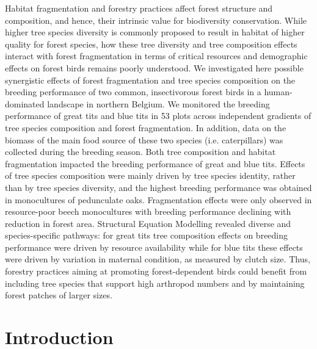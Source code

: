 \documentclass[10pt, twoside]{book} %
\begin{document}
Habitat fragmentation and forestry practices affect forest structure and composition, and hence, their intrinsic value for biodiversity conservation. While higher tree species diversity is commonly proposed to result in habitat of higher quality for forest species, how these tree diversity and tree composition effects interact with forest fragmentation in terms of critical resources and demographic effects on forest birds remains poorly understood. We investigated here possible synergistic effects of forest fragmentation and tree species composition on the breeding performance of two common, insectivorous forest birds in a human-dominated landscape in northern Belgium. We monitored the breeding performance of great tits and blue tits in 53 plots across independent gradients of tree species composition and forest fragmentation. In addition, data on the biomass of the main food source of these two species (i.e. caterpillars) was collected during the breeding season. Both tree composition and habitat fragmentation impacted the breeding performance of great and blue tits. Effects of tree species composition were mainly driven by tree species identity, rather than by tree species diversity, and the highest breeding performance was obtained in monocultures of pedunculate oaks. Fragmentation effects were only observed in resource-poor beech monocultures with breeding performance declining with reduction in forest area. Structural Equation Modelling revealed diverse and species-specific pathways: for great tits tree composition effects on breeding performance were driven by resource availability while for blue tits these effects were driven by variation in maternal condition, as measured by clutch size. Thus, forestry practices aiming at promoting forest-dependent birds could benefit from including tree species that support high arthropod numbers and by maintaining forest patches of larger sizes.\\
\clearpage
	
	\section{Introduction}
\end{document}
